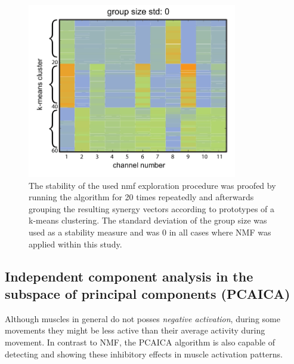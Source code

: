 \begin{figure}[ht]
	\centering
		\includegraphics[height=3in]{images/nmf_expl_stab3.pdf}
	\caption{The stability of the used nmf exploration procedure was proofed by running the algorithm for 20 times repeatedly and afterwards grouping the resulting synergy vectors according to prototypes of a k-means clustering. The standard deviation of the group size was used as a stability measure and was 0 in all cases where NMF was applied within this study.}
	\label{sg:fig:images_nmf_expl_stab3}
\end{figure}


\subsection{Independent component analysis in the subspace of principal components (PCAICA)} %
\label{sg:sub:pcaica}

Although muscles in general do not posses \emph{negative activation}, during some movements they might be less active than their average activity during movement. In contrast to NMF, the PCAICA algorithm is also capable of detecting and showing these inhibitory effects in muscle activation patterns. 

